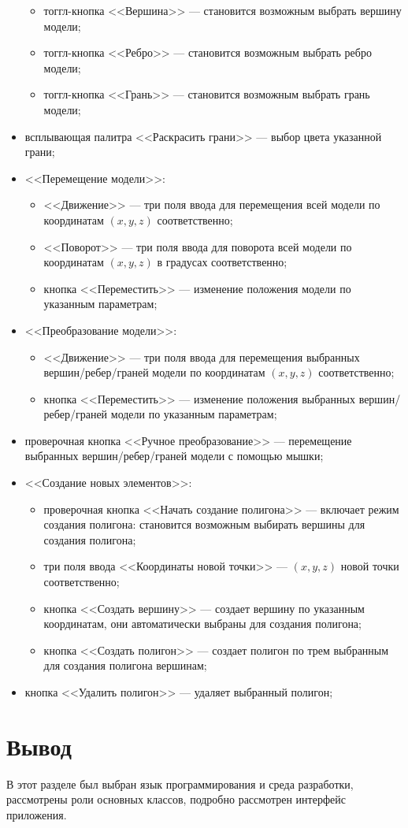 \begin{itemize}
\begin{itemize}
		\item тоггл-кнопка <<Вершина>> --- становится возможным выбрать вершину модели;
		\item тоггл-кнопка <<Ребро>> --- становится возможным выбрать ребро модели;
		\item тоггл-кнопка <<Грань>> --- становится возможным выбрать грань модели;
	\end{itemize}
	\item всплывающая палитра <<Раскрасить грани>> --- выбор цвета указанной грани;
	\item <<Перемещение модели>>:
	\begin{itemize}
		\item <<Движение>> --- три поля ввода для перемещения всей модели по координатам $(x, y, z)$ соответственно;
		\item <<Поворот>> --- три поля ввода для поворота всей модели по координатам $(x, y, z)$ в градусах соответственно;
		\item кнопка <<Переместить>> --- изменение положения модели по указанным параметрам;
	\end{itemize}
	\item <<Преобразование модели>>:
	\begin{itemize}
		\item <<Движение>> --- три поля ввода для перемещения выбранных вершин/ребер/граней модели по координатам $(x, y, z)$ соответственно;
		\item кнопка <<Переместить>> --- изменение положения выбранных вершин/ребер/граней модели по указанным параметрам;
	\end{itemize}
	\item проверочная кнопка <<Ручное преобразование>> --- перемещение выбранных вершин/ребер/граней модели с помощью мышки;
	\item <<Создание новых элементов>>:
	\begin{itemize}
		\item проверочная кнопка <<Начать создание полигона>> --- включает режим создания полигона: становится возможным выбирать вершины для создания полигона;
		\item три поля ввода <<Координаты новой точки>> --- $(x, y, z)$ новой точки соответственно;
		\item кнопка <<Создать вершину>> --- создает вершину по указанным координатам, они автоматически выбраны для создания полигона;
		\item кнопка <<Создать полигон>> --- создает полигон по трем выбранным для создания полигона вершинам;
	\end{itemize}
	\item кнопка <<Удалить полигон>> --- удаляет выбранный полигон;
\end{itemize}

\section*{Вывод}

В этот разделе был выбран язык программирования и среда разработки, рассмотрены роли основных классов, подробно рассмотрен интерфейс приложения.